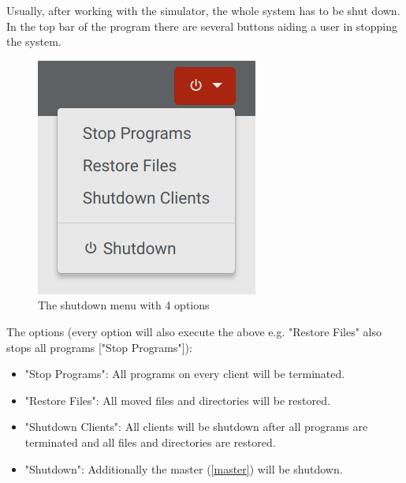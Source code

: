 \documentclass[accentcolor=tud1a, paper=a4, colorback]{tudreport}
\begin{document}
	Usually, after working with the simulator, the whole system has to be shut down. In the top
	bar of the program there are several buttons aiding a user in stopping the system.
	\begin{figure}[H]
		\centering
		\includegraphics[width=.2\textwidth]{shutdown_dropdown_menu}
		\caption{The shutdown menu with 4 options}
		\label{shutdown_dropdown_menu}
	\end{figure}
	The options (every option will also execute the above e.g. "Restore Files" also stops all programs ["Stop Programs"]):
	\begin{itemize}
		\item "Stop Programs": All programs on every client will be terminated.
		\item "Restore Files": All moved files and directories will be restored.
		\item "Shutdown Clients": All clients will be shutdown after all programs are terminated and all files and directories are restored. 
		\item "Shutdown": Additionally the master (\ref{master}) will be shutdown.
	\end{itemize}
\end{document}
